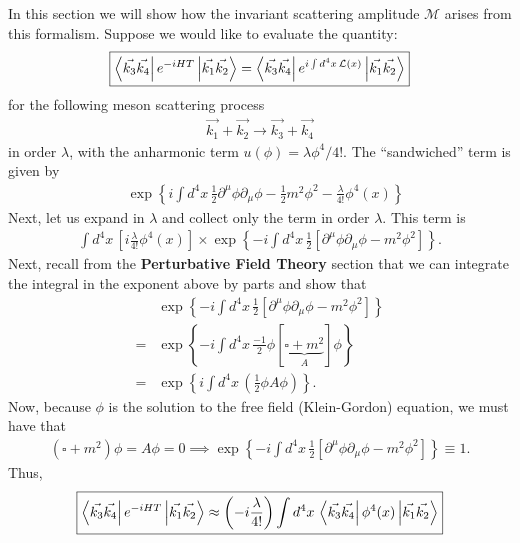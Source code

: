 \documentclass{book}
\theoremstyle{definition}
\newcommand{\p}{\partial}
\newcommand{\lag}{\mathcal{L}}
\newcommand{\f}[2]{\frac{#1}{#2}}
\newcommand{\lp}{\left(}
\newcommand{\rp}{\right)}
\newcommand{\lb}{\left[}
\newcommand{\rb}{\right]}
\newcommand{\lc}{\left\{}
\newcommand{\rc}{\right\}}
\begin{document}
In this section we will show how the invariant scattering amplitude $\mathcal{M}$ arises from this formalism. Suppose we would like to evaluate the quantity:
\begin{align}
\boxed{\bra{\vec{k_3}\vec{k_4}}e^{-iH T}\ket{\vec{k_1} \vec{k_2}} = \bra{\vec{k_3}\vec{k_4}}e^{i \int d^4x\, \lag(x) }\ket{\vec{k_1} \vec{k_2}} }
\end{align} 
for the following meson scattering process
\begin{align}
\vec{k_1} + \vec{k_2} \to \vec{k_3}+ \vec{k_4}
\end{align}
in order $\lambda$, with the anharmonic term $u(\phi) = \lambda \phi^4 / 4!$. The ``sandwiched'' term is given by
\begin{align}
&\exp\lc i \int d^4x\,\f{1}{2}\p^\mu \phi \p_\mu \phi - \f{1}{2}m^2\phi^2 - \f{\lambda}{4!}\phi^4(x) \rc
\end{align}
Next, let us expand in $\lambda$ and collect only the term in order $\lambda$. This term is 
\begin{align}
\int d^4x\,\lb i\f{\lambda}{4!}\phi^4(x) \rb \times \exp\lc -i \int d^4x\,\f{1}{2}\lb \p^\mu \phi \p_\mu \phi - m^2\phi^2 \rb \rc.
\end{align}
Next, recall from the \textbf{Perturbative Field Theory} section that we can integrate the integral in the exponent above by parts and show that 
\begin{align}
&\exp\lc -i \int d^4x\,\f{1}{2}\lb \p^\mu \phi \p_\mu \phi - m^2\phi^2 \rb \rc \nonumber\\
= &\exp\lc -i \int d^4x\,\f{-1}{2}\phi\lb \underbrace{ \square + m^2}_{A} \rb\phi \rc \nonumber\\
= &\exp\lc i \int d^4x\,\lp\f{1}{2}\phi A \phi\rp \rc.
\end{align}
Now, because $\phi$ is the solution to the free field (Klein-Gordon) equation, we must have that
\begin{align}
(\square + m^2)\phi = A\phi = 0 \implies \exp\lc -i \int d^4x\,\f{1}{2}\lb \p^\mu \phi \p_\mu \phi - m^2\phi^2 \rb \rc \equiv 1. 
\end{align}
Thus,
\begin{align}
\boxed{\bra{\vec{k_3}\vec{k_4}}e^{-iH T}\ket{\vec{k_1} \vec{k_2}} \approx \lp -i\f{\lambda}{4!} \rp\int d^4x \, \bra{\vec{k_3}\vec{k_4}}\phi^4(x)\ket{\vec{k_1} \vec{k_2}}}
\end{align}
  
\end{document}
